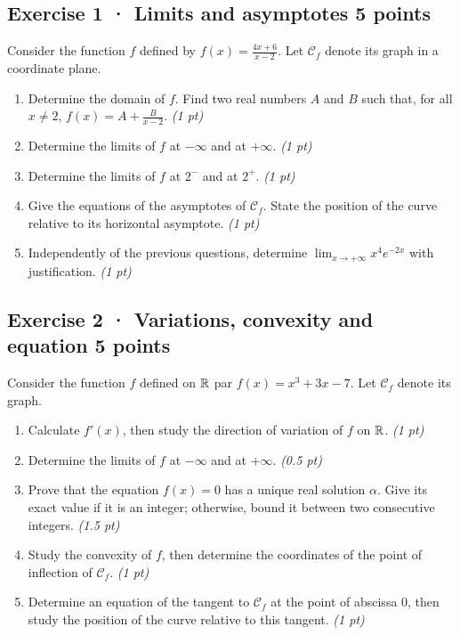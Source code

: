 \subsection*{Exercise 1 · Limits and asymptotes \hfill 5 points}Consider the function $f$ defined by $f(x)=\frac{4x+6}{x-2}$. Let $\mathcal C_f$ denote its graph in a coordinate plane.

\begin{enumerate}

\item Determine the domain of $f$. Find two real numbers $A$ and $B$ such that, for all $x\ne2$, $f(x)=A+\frac B{x-2}$. \hfill\textit{(1 pt)}

\item Determine the limits of $f$ at $-\infty$ and at $+\infty$. \hfill\textit{(1 pt)}

\item Determine the limits of $f$ at $2^-$ and at $2^+$. \hfill\textit{(1 pt)}

\item Give the equations of the asymptotes of $\mathcal C_f$. State the position of the curve relative to its horizontal asymptote. \hfill\textit{(1 pt)}

\item Independently of the previous questions, determine $\displaystyle\lim_{x\to+\infty}x^{4}e^{-2x}$ with justification. \hfill\textit{(1 pt)}

\end{enumerate}

\subsection*{Exercise 2 · Variations, convexity and equation \hfill 5 points}Consider the function $f$ defined on $\mathbb R$ par $f(x)=x^3+3x-7$. Let $\mathcal C_f$ denote its graph.

\begin{enumerate}

\item Calculate $f'(x)$, then study the direction of variation of $f$ on $\mathbb R$. \hfill\textit{(1 pt)}

\item Determine the limits of $f$ at $-\infty$ and at $+\infty$. \hfill\textit{(0.5 pt)}

\item Prove that the equation $f(x)=0$ has a unique real solution $\alpha$. Give its exact value if it is an integer; otherwise, bound it between two consecutive integers. \hfill\textit{(1.5 pt)}

\item Study the convexity of $f$, then determine the coordinates of the point of inflection of $\mathcal C_f$. \hfill\textit{(1 pt)}

\item Determine an equation of the tangent to $\mathcal C_f$ at the point of abscissa $0$, then study the position of the curve relative to this tangent. \hfill\textit{(1 pt)}

\end{enumerate}

